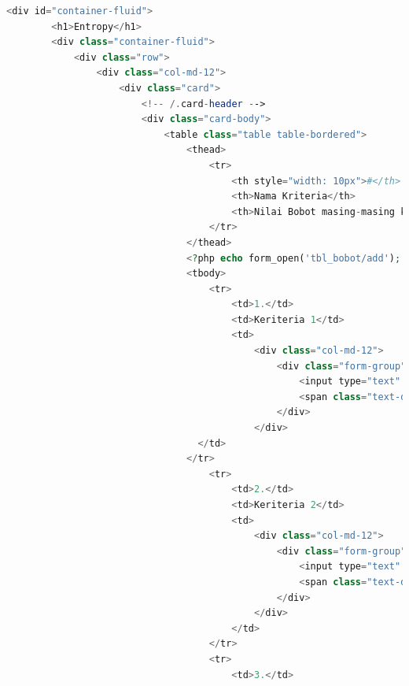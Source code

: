 \begin{lstlisting}[language=PHP]
	<div id="container-fluid">  
	    <h1>Entropy</h1>  
	    <div class="container-fluid">  
	        <div class="row">  
	            <div class="col-md-12">  
	                <div class="card">  
	                    <!-- /.card-header -->  
	                    <div class="card-body">  
	                        <table class="table table-bordered">  
	                            <thead>  
	                                <tr>  
	                                    <th style="width: 10px">#</th>  
	                                    <th>Nama Kriteria</th>  
	                                    <th>Nilai Bobot masing-masing kriteria</th>  
	                                </tr>  
	                            </thead>  
	                            <?php echo form_open('tbl_bobot/add'); ?>  
	                            <tbody>  
	                                <tr>  
	                                    <td>1.</td>  
	                                    <td>Keriteria 1</td>  
	                                    <td>  
	                                        <div class="col-md-12">  
	                                            <div class="form-group">  
	                                                <input type="text" name="bobot_keriteria1" value="<?= $c1 ?>" class="form-control" id="bobot_keriteria1" readonly />  
	                                                <span class="text-danger"><?php echo form_error('bobot_keriteria1'); ?></span>  
	                                            </div>  
	                                        </div>  
                                  </td>  
                                </tr>  
	                                <tr>  
	                                    <td>2.</td>  
	                                    <td>Keriteria 2</td>  
	                                    <td>  
	                                        <div class="col-md-12">  
	                                            <div class="form-group">  
	                                                <input type="text" name="bobot_keriteria2" value="<?= $c2 ?>" class="form-control" id="bobot_keriteria2" readonly />  
	                                                <span class="text-danger"><?php echo form_error('bobot_keriteria2'); ?></span>  
	                                            </div>  
	                                        </div>  
	                                    </td>  
	                                </tr>  
	                                <tr>  
	                                    <td>3.</td>  

\end{lstlisting}
